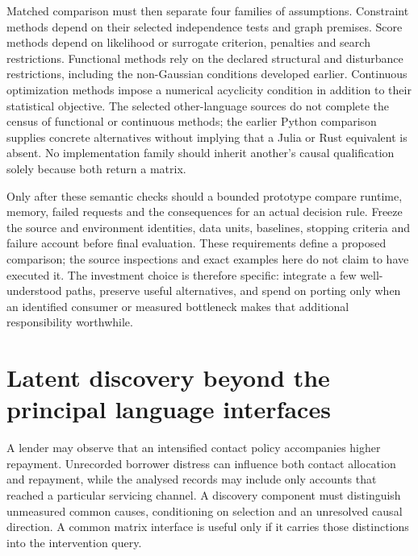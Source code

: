 Matched comparison must then separate four families of assumptions.
Constraint methods depend on their selected independence tests and graph
premises. Score methods depend on likelihood or surrogate criterion,
penalties and search restrictions. Functional methods rely on the declared
structural and disturbance restrictions, including the non-Gaussian
conditions developed earlier. Continuous optimization methods impose a
numerical acyclicity condition in addition to their statistical objective.
The selected other-language sources do not complete the census of
functional or continuous methods; the earlier Python comparison supplies
concrete alternatives without implying that a Julia or Rust equivalent is
absent. No implementation family should inherit another's causal
qualification solely because both return a matrix.

Only after these semantic checks should a bounded prototype compare runtime,
memory, failed requests and the consequences for an actual decision rule.
Freeze the source and environment identities, data units, baselines,
stopping criteria and failure account before final evaluation. These
requirements define a proposed comparison; the source inspections and exact
examples here do not claim to have executed it. The investment choice is
therefore specific: integrate a few well-understood paths, preserve useful
alternatives, and spend on porting only when an identified consumer or
measured bottleneck makes that additional responsibility worthwhile.
\label{exec13:other-discovery-end}


\hypertarget{latent-discovery-beyond-the-principal-language-interfaces}{%
\section{Latent discovery beyond the principal language
interfaces}\label{latent-discovery-beyond-the-principal-language-interfaces}}

\label{exec14:other-latent}

A lender may observe that an intensified contact policy accompanies
higher repayment. Unrecorded borrower distress can influence both
contact allocation and repayment, while the analysed records may include
only accounts that reached a particular servicing channel. A discovery
component must distinguish unmeasured common causes, conditioning on
selection and an unresolved causal direction. A common matrix interface
is useful only if it carries those distinctions into the intervention
query.

